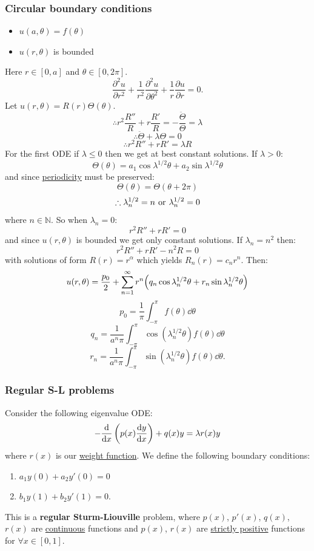 \documentclass{article}
\begin{document}
\begin{multicols}{3}
\subsubsection*{Circular boundary conditions}
\begin{itemize}
    \item $u(a,\theta)=f(\theta)$
    \item $u(r,\theta)$ is bounded
\end{itemize}
Here $r\in[0,a]$ and $\theta\in[0,2\pi]$.
$$\frac{\partial^2 u}{\partial r^2}+\frac{1}{r^2}\frac{\partial^2 u}{\partial\theta^2}
+\frac{1}{r}\frac{\partial u}{\partial r}=0.$$
Let $u(r,\theta)=R(r)\Theta(\theta)$.
$$\therefore r^2\frac{R''}{R}+r\frac{R'}{R}=-\frac{\ddot{\Theta}}{\Theta}=\lambda$$
$$\therefore\ddot{\Theta}+\lambda\Theta=0$$
$$\therefore r^2 R''+rR'=\lambda R$$
For the first ODE if $\lambda\leq0$ then we get
at best constant solutions. If $\lambda>0$:
$$\Theta(\theta)=a_1\cos\lambda^{1/2}\theta
+a_2\sin\lambda^{1/2}\theta$$
and since \underline{periodicity} must be preserved:
$$\Theta(\theta)=\Theta(\theta+2\pi)$$
$$\therefore\lambda_n^{1/2}=n
\hspace{0.05in}\text{or}\hspace{0.05in}
\lambda_n^{1/2}=0$$
where $n\in\mathbb{N}$. So when $\lambda_n=0$:
$$r^2 R''+rR'=0$$
and since $u(r,\theta)$ is bounded we get only constant solutions.
If $\lambda_n=n^2$ then:
$$r^2 R''+rR'-n^2 R=0$$
with solutions of form $R(r)=r^{\alpha}$ which yields
$R_n(r)=c_n r^n$. Then:
$$u(r,\theta)=\frac{p_0}{2}+\sum_{n=1}^{\infty}
r^n\Bigl(q_n\cos\lambda_n^{1/2}\theta
+r_n\sin\lambda_n^{1/2}\theta\Bigr)$$
$$p_0=\frac{1}{\pi}\int_{-\pi}^{\pi}f(\theta)\dd\theta$$
$$q_n=\frac{1}{a^n\pi}\int_{-\pi}^{\pi}
\cos(\lambda_n^{1/2}\theta)f(\theta)\dd\theta$$
$$r_n=\frac{1}{a^n\pi}\int_{-\pi}^{\pi}
\sin(\lambda_n^{1/2}\theta)f(\theta)\dd\theta.$$

\subsubsection*{Regular S-L problems}
Consider the following eigenvalue ODE:
$$-\dv{x}\left(p(x)\dv{y}{x}\right)+q(x)y=\lambda r(x)y$$
where $r(x)$ is our \underline{weight function}.
We define the following boundary conditions:
\begin{enumerate}
    \item $a_1 y(0)+a_2 y'(0)=0$

    \item $b_1 y(1)+b_2 y'(1)=0.$
\end{enumerate}
This is a \textbf{regular Sturm-Liouville} problem, where $p(x)$, $p'(x)$, $q(x)$, $r(x)$ are \underline{continuous} functions and $p(x)$, $r(x)$ are \underline{strictly positive} functions for $\forall x\in[0,1]$.


\end{multicols}
\end{document}
